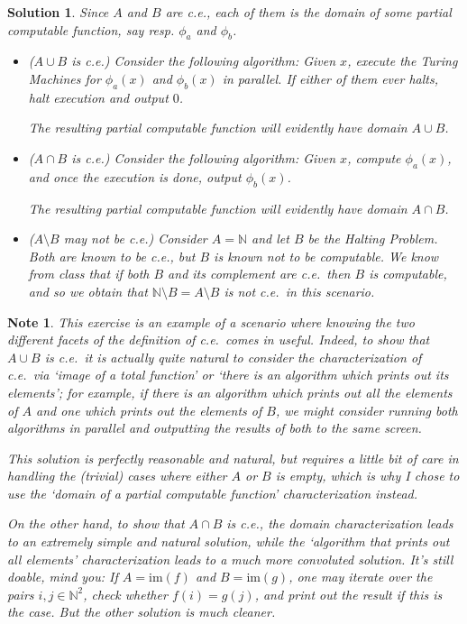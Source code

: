 \documentclass{article}
\theoremstyle{nonumberplain}
\newtheorem{sol}{Solution}
\newtheorem{note}{Note}
\newcommand{\N}{\mathbb{N}}
\begin{document}
\begin{sol}
Since $A$ and $B$ are c.e., each of them is the domain of some partial computable function, say resp. $\phi_a$ and $\phi_b$.
\begin{itemize}
\item ($A \cup B$ is c.e.) Consider the following algorithm: Given $x$, execute the Turing Machines for $\phi_a(x)$ and $\phi_b(x)$ in parallel. If either of them ever halts, halt execution and output $0$.

The resulting partial computable function will evidently have domain $A \cup B$.

\item ($A \cap B$ is c.e.) Consider the following algorithm: Given $x$, compute $\phi_a(x)$, and once the execution is done, output $\phi_b(x)$.

The resulting partial computable function will evidently have domain $A \cap B$.

\item ($A \setminus B$ may not be c.e.) Consider $A = \N$ and let $B$ be the Halting Problem. Both are known to be c.e., but $B$ is known not to be computable. We know from class that if both $B$ and its complement are c.e.\ then $B$ is computable, and so we obtain that $\N \setminus B = A \setminus B$ is not c.e.\ in this scenario.
\end{itemize}
\end{sol}

\begin{note}
This exercise is an example of a scenario where knowing the two different facets of the definition of c.e.\ comes in useful. Indeed, to show that $A \cup B$ is c.e.\ it is actually quite natural to consider the characterization of c.e.\ via `image of a total function' or `there is an algorithm which prints out its elements'; for example, if there is an algorithm which prints out all the elements of $A$ and one which prints out the elements of $B$, we might consider running both algorithms in parallel and outputting the results of both to the same screen.

This solution is perfectly reasonable and natural, but requires a little bit of care in handling the (trivial) cases where either $A$ or $B$ is empty, which is why I chose to use the `domain of a partial computable function' characterization instead.

On the other hand, to show that $A \cap B$ is c.e., the domain characterization leads to an extremely simple and natural solution, while the `algorithm that prints out all elements' characterization leads to a much more convoluted solution. It's still doable, mind you: If $A = \mathrm{im}(f)$ and $B = \mathrm{im}(g)$, one may iterate over the pairs $i,j \in \N^2$, check whether $f(i) = g(j)$, and print out the result if this is the case. But the other solution is much cleaner.
\end{note}
\end{document}
